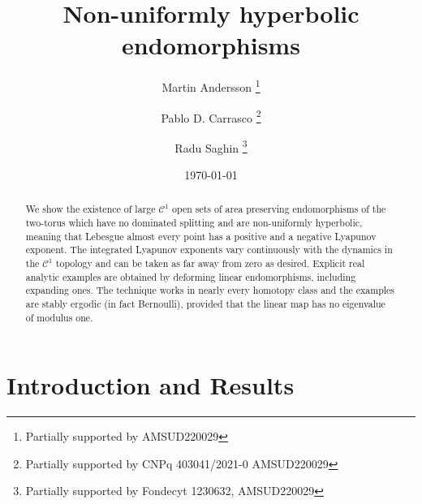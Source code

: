 \documentclass[11pt,letterpaper,reqno]{article}
\makeatletter
\newcommand{\subjclass}[2][2020]{%
  \let\@oldtitle\@title%
  \gdef\@title{\@oldtitle\footnotetext{#1 \emph{MSC2020 classification:} #2}}%
}
\newcommand{\keywords}[1]{%
  \let\@@oldtitle\@title%
  \gdef\@title{\@@oldtitle\footnotetext{\emph{Keywords:} #1.}}%
}
\makeatother
\begin{document}
 \title{Non-uniformly hyperbolic endomorphisms}
  \author[1]{Martin Andersson \thanks{Partially supported by AMSUD220029}} 	
  \author[2]{Pablo D. Carrasco \thanks{Partially supported by CNPq 403041/2021-0 AMSUD220029}}
  \author[3]{Radu Saghin \thanks{Partially supported by Fondecyt 1230632, AMSUD220029}}
  





  \date{\today}
  
  \subjclass{37D25, 37A05}
  \keywords{Non-uniform Hyperbolicity, Lyapunov Exponents, Stable Ergodicity}  
  \maketitle

{}
\begin{abstract}

We show the existence of large $\mathcal C^1$ open sets of area preserving endomorphisms of the two-torus which have no dominated splitting and are non-uniformly hyperbolic, meaning that Lebesgue almost every point has a positive and a negative Lyapunov exponent. The integrated Lyapunov exponents vary continuously with the dynamics in the $\mathcal C^1$ topology and can be taken as far away from zero as desired. Explicit real analytic examples are obtained by deforming linear endomorphisms, including expanding ones. The technique works in nearly every homotopy class and the examples are stably ergodic (in fact Bernoulli), provided that the linear map has no eigenvalue of modulus one.
\end{abstract}




\section{Introduction and Results} %
\label{sec:introduction_and_results}
\end{document}
